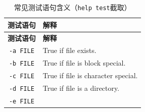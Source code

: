 \documentclass[doctor,openright,twoside]{sjtuthesis}
\newcommand{\passthrough}[1]{#1}
\theoremstyle{plain}
\theoremstyle{definition}
\theoremstyle{remark}
\theoremstyle{ocrenumbox}
\theoremstyle{plain}
\begin{document}
\begin{longtable}[]{@{}cl@{}}
\caption{常见测试语句含义（\passthrough{\lstinline!help test!}截取）}\tabularnewline
\toprule
\begin{minipage}[b]{0.20\columnwidth}\centering
\textbf{测试语句}\strut
\end{minipage} & \begin{minipage}[b]{0.74\columnwidth}\raggedright
\textbf{解释}\strut
\end{minipage}\tabularnewline
\midrule
\endfirsthead
\toprule
\begin{minipage}[b]{0.20\columnwidth}\centering
\textbf{测试语句}\strut
\end{minipage} & \begin{minipage}[b]{0.74\columnwidth}\raggedright
\textbf{解释}\strut
\end{minipage}\tabularnewline
\midrule
\endhead
\begin{minipage}[t]{0.20\columnwidth}\centering
\passthrough{\lstinline!-a FILE!}\strut
\end{minipage} & \begin{minipage}[t]{0.74\columnwidth}\raggedright
True if file exists.\strut
\end{minipage}\tabularnewline
\begin{minipage}[t]{0.20\columnwidth}\centering
\passthrough{\lstinline!-b FILE!}\strut
\end{minipage} & \begin{minipage}[t]{0.74\columnwidth}\raggedright
True if file is block special.\strut
\end{minipage}\tabularnewline
\begin{minipage}[t]{0.20\columnwidth}\centering
\passthrough{\lstinline!-c FILE!}\strut
\end{minipage} & \begin{minipage}[t]{0.74\columnwidth}\raggedright
True if file is character special.\strut
\end{minipage}\tabularnewline
\begin{minipage}[t]{0.20\columnwidth}\centering
\passthrough{\lstinline!-d FILE!}\strut
\end{minipage} & \begin{minipage}[t]{0.74\columnwidth}\raggedright
True if file is a directory.\strut
\end{minipage}\tabularnewline
\begin{minipage}[t]{0.20\columnwidth}\centering
\passthrough{\lstinline!-e FILE!}\strut
\end{minipage} & \begin{minipage}[t]{0.74\columnwidth}\raggedright

\end{minipage}
\end{longtable}
\end{document}

